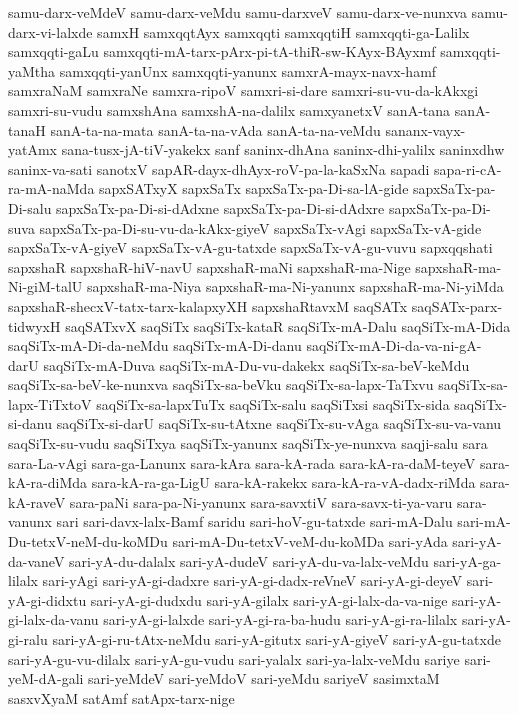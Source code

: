 {samu-darx-veMdeV
samu-darx-veMdu
samu-darxveV
samu-darx-ve-nunxva
samu-darx-vi-lalxde
samxH
samxqqtAyx
samxqqti
samxqqtiH
samxqqti-ga-Lalilx
samxqqti-gaLu
samxqqti-mA-tarx-pArx-pi-tA-thiR-sw-KAyx-BAyxmf
samxqqti-yaMtha
samxqqti-yanUnx
samxqqti-yanunx
samxrA-mayx-navx-hamf
samxraNaM
samxraNe
samxra-ripoV
samxri-si-dare
samxri-su-vu-da-kAkxgi
samxri-su-vudu
samxshAna
samxshA-na-dalilx
samxyanetxV
sanA-tana
sanA-tanaH
sanA-ta-na-mata
sanA-ta-na-vAda
sanA-ta-na-veMdu
sananx-vayx-yatAmx
sana-tusx-jA-tiV-yakekx
sanf
saninx-dhAna
saninx-dhi-yalilx
saninxdhw
saninx-va-sati
sanotxV
sapAR-dayx-dhAyx-roV-pa-la-kaSxNa
sapadi
sapa-ri-cA-ra-mA-naMda
sapxSATxyX
sapxSaTx
sapxSaTx-pa-Di-sa-lA-gide
sapxSaTx-pa-Di-salu
sapxSaTx-pa-Di-si-dAdxne
sapxSaTx-pa-Di-si-dAdxre
sapxSaTx-pa-Di-suva
sapxSaTx-pa-Di-su-vu-da-kAkx-giyeV
sapxSaTx-vAgi
sapxSaTx-vA-gide
sapxSaTx-vA-giyeV
sapxSaTx-vA-gu-tatxde
sapxSaTx-vA-gu-vuvu
sapxqqshati
sapxshaR
sapxshaR-hiV-navU
sapxshaR-maNi
sapxshaR-ma-Nige
sapxshaR-ma-Ni-giM-talU
sapxshaR-ma-Niya
sapxshaR-ma-Ni-yanunx
sapxshaR-ma-Ni-yiMda
sapxshaR-shecxV-tatx-tarx-kalapxyXH
sapxshaRtavxM
saqSATx
saqSATx-parx-tidwyxH
saqSATxvX
saqSiTx
saqSiTx-kataR
saqSiTx-mA-Dalu
saqSiTx-mA-Dida
saqSiTx-mA-Di-da-neMdu
saqSiTx-mA-Di-danu
saqSiTx-mA-Di-da-va-ni-gA-darU
saqSiTx-mA-Duva
saqSiTx-mA-Du-vu-dakekx
saqSiTx-sa-beV-keMdu
saqSiTx-sa-beV-ke-nunxva
saqSiTx-sa-beVku
saqSiTx-sa-lapx-TaTxvu
saqSiTx-sa-lapx-TiTxtoV
saqSiTx-sa-lapxTuTx
saqSiTx-salu
saqSiTxsi
saqSiTx-sida
saqSiTx-si-danu
saqSiTx-si-darU
saqSiTx-su-tAtxne
saqSiTx-su-vAga
saqSiTx-su-va-vanu
saqSiTx-su-vudu
saqSiTxya
saqSiTx-yanunx
saqSiTx-ye-nunxva
saqji-salu
sara
sara-La-vAgi
sara-ga-Lanunx
sara-kAra
sara-kA-rada
sara-kA-ra-daM-teyeV
sara-kA-ra-diMda
sara-kA-ra-ga-LigU
sara-kA-rakekx
sara-kA-ra-vA-dadx-riMda
sara-kA-raveV
sara-paNi
sara-pa-Ni-yanunx
sara-savxtiV
sara-savx-ti-ya-varu
sara-vanunx
sari
sari-davx-lalx-Bamf
saridu
sari-hoV-gu-tatxde
sari-mA-Dalu
sari-mA-Du-tetxV-neM-du-koMDu
sari-mA-Du-tetxV-veM-du-koMDa
sari-yAda
sari-yA-da-vaneV
sari-yA-du-dalalx
sari-yA-dudeV
sari-yA-du-va-lalx-veMdu
sari-yA-ga-lilalx
sari-yAgi
sari-yA-gi-dadxre
sari-yA-gi-dadx-reVneV
sari-yA-gi-deyeV
sari-yA-gi-didxtu
sari-yA-gi-dudxdu
sari-yA-gilalx
sari-yA-gi-lalx-da-va-nige
sari-yA-gi-lalx-da-vanu
sari-yA-gi-lalxde
sari-yA-gi-ra-ba-hudu
sari-yA-gi-ra-lilalx
sari-yA-gi-ralu
sari-yA-gi-ru-tAtx-neMdu
sari-yA-gitutx
sari-yA-giyeV
sari-yA-gu-tatxde
sari-yA-gu-vu-dilalx
sari-yA-gu-vudu
sari-yalalx
sari-ya-lalx-veMdu
sariye
sari-yeM-dA-gali
sari-yeMdeV
sari-yeMdoV
sari-yeMdu
sariyeV
sasimxtaM
sasxvXyaM
satAmf
satApx-tarx-nige
}
